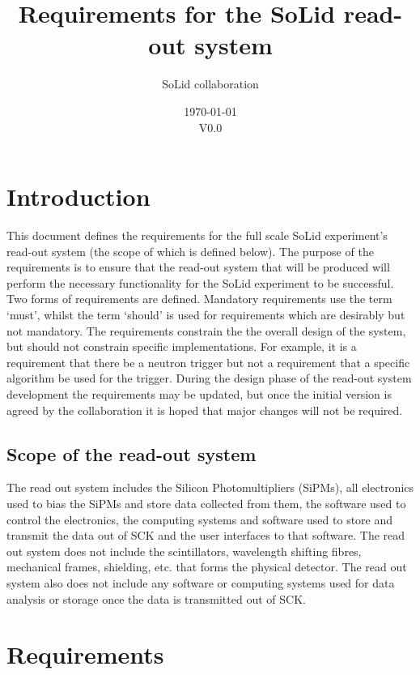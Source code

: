 \documentclass[a4paper]{article}
\title{Requirements for the SoLid read-out system}
\author[]{SoLid collaboration}
\date{\today\\V0.0}
\begin{document}
\maketitle

\tableofcontents

\section{Introduction}

This document defines the requirements for the full scale SoLid experiment's read-out system (the scope of which is defined below).
The purpose of the requirements is to ensure that the read-out system that will be produced will perform the necessary functionality for the SoLid experiment to be successful.
Two forms of requirements are defined.
Mandatory requirements use the term `must', whilst the term `should' is used for requirements which are desirably but not mandatory.
The requirements constrain the the overall design of the system, but should not constrain specific implementations.
For example, it is a requirement that there be a neutron trigger but not a requirement that a specific algorithm be used for the trigger.
During the design phase of the read-out system development the requirements may be updated, but once the initial version is agreed by the collaboration it is hoped that major changes will not be required.

\subsection{Scope of the read-out system}

The read out system includes the Silicon Photomultipliers (SiPMs), all electronics used to bias the SiPMs and store data collected from them, the software used to control the electronics,  the computing systems and software used to store and transmit the data out of SCK and the user interfaces to that software. 
The read out system does not include the scintillators, wavelength shifting fibres, mechanical frames, shielding, etc. that forms the physical detector. 
The read out system also does not include any software or computing systems used for data analysis or storage once the data is transmitted out of SCK.

\section{Requirements}
\end{document}
